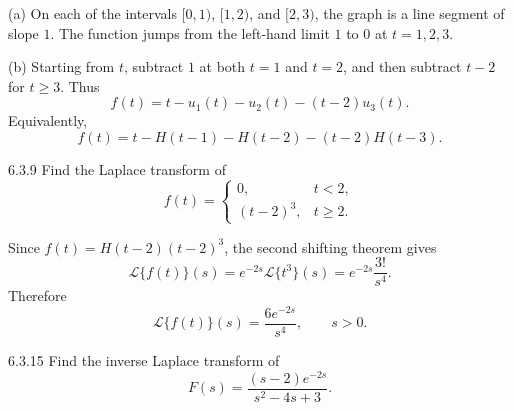 \documentclass[11pt,oneside]{article}
\begin{document}
\begin{solution}
\noindent\textup{(a)} On each of the intervals $[0, 1)$, $[1, 2)$, and $[2, 3)$, the graph is a line segment of slope $1$. The function jumps from the left-hand limit $1$ to $0$ at $t=1, 2, 3$.
\begin{center}
\end{center}

\noindent\textup{(b)} Starting from $t$, subtract $1$ at both $t=1$ and $t=2$, and then subtract $t-2$ for $t\geq3$. Thus
\[
    \boxed{f(t)=t-u_1(t)-u_2(t)-(t-2)u_3(t)}.
\]
Equivalently,
\[
    f(t)=t-H(t-1)-H(t-2)-(t-2)H(t-3).
\]
\end{solution}

\begin{problem}{6.3.9}
Find the Laplace transform of
\[
    f(t)=
    \begin{cases}
        0, & t<2,\\
        (t-2)^3, & t\geq2.
    \end{cases}
\]
\end{problem}

\begin{solution}
Since $f(t)=H(t-2)(t-2)^3$, the second shifting theorem gives
\[
    \mathcal{L}\{f(t)\}(s)
    =e^{-2s}\mathcal{L}\{t^3\}(s)
    =e^{-2s}\frac{3!}{s^4}.
\]
Therefore
\[
    \boxed{\mathcal{L}\{f(t)\}(s)=\frac{6e^{-2s}}{s^4}}, \qquad s>0.
\]
\end{solution}

\begin{problem}{6.3.15}
Find the inverse Laplace transform of
\[
    F(s)=\frac{(s-2)e^{-2s}}{s^2-4s+3}.
\]
\end{problem}
\end{document}
